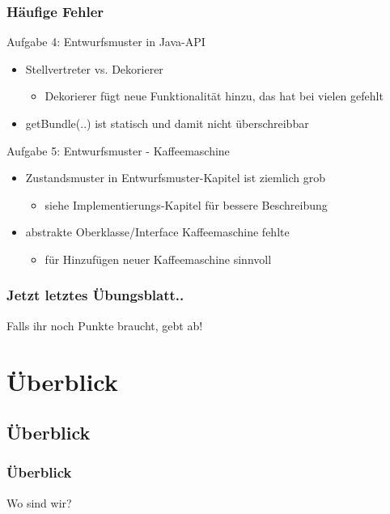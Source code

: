 \documentclass[18pt]{beamer}
\begin{document}
	\begin{frame}
		\frametitle{Häufige Fehler}
		\begin{block}{Aufgabe 4: Entwurfsmuster in Java-API}
			\begin{itemize}
				\item Stellvertreter vs. Dekorierer
				\begin{itemize}
					\item Dekorierer fügt neue Funktionalität hinzu, das hat bei vielen gefehlt
				\end{itemize}
				\pause
				\item getBundle(..) ist statisch und damit nicht überschreibbar 
			\end{itemize}
		\end{block}
		\pause
		\begin{block}{Aufgabe 5: Entwurfsmuster - Kaffeemaschine}
			\begin{itemize}
				\item Zustandsmuster in Entwurfsmuster-Kapitel ist ziemlich grob
				\begin{itemize}
					\item siehe Implementierungs-Kapitel für bessere Beschreibung
				\end{itemize}
				\pause
				\item abstrakte Oberklasse/Interface Kaffeemaschine fehlte 
				\begin{itemize}
					\item für Hinzufügen neuer Kaffeemaschine sinnvoll
				\end{itemize}
			\end{itemize}
		\end{block}
	\end{frame}

	\begin{frame}
		\frametitle{Jetzt letztes Übungsblatt..}
		\begin{huge}
			Falls ihr noch Punkte braucht, gebt ab!
		\end{huge}
\end{frame}

\section{Überblick}
	\subsection{Überblick}
	\begin{frame}
		\frametitle{Überblick}
		\centering \huge Wo sind wir?
	\end{frame}
	
\end{document}
